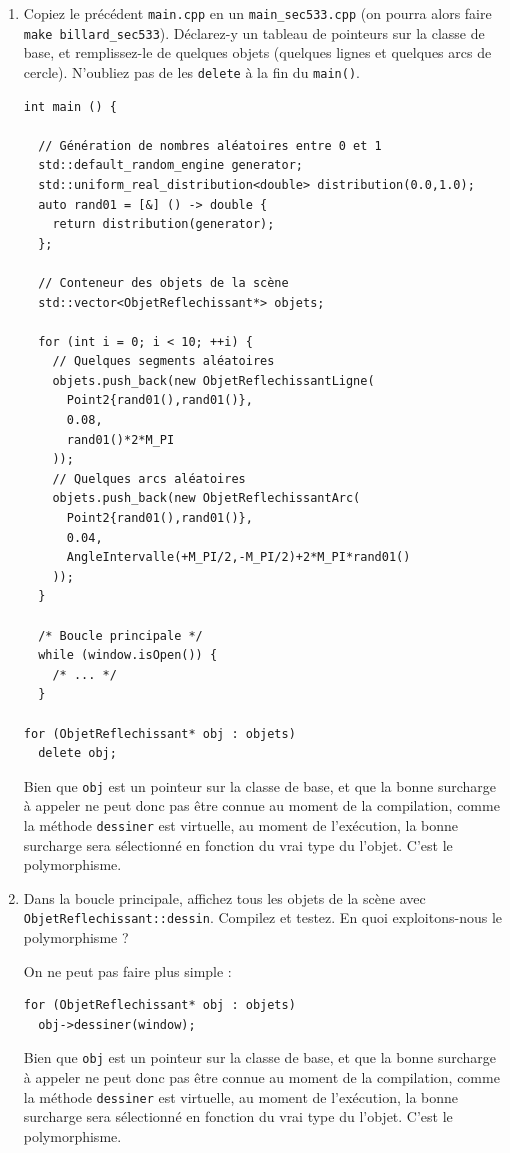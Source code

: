 \documentclass{book}
\newcommand{\inline}[1]{\texttt{#1}}
\def\filename{\texttt}
\begin{document}
\begin{enumerate}

  \item Copiez le précédent \filename{main.cpp} en un \filename{main\_sec533.cpp} (on pourra alors faire \texttt{make billard\_sec533}). Déclarez-y un tableau de pointeurs sur la classe de base, et remplissez-le de quelques objets (quelques lignes et quelques arcs de cercle). N'oubliez pas de les \inline{delete} à la fin du \inline{main()}.

\begin{correction}
\begin{verbatim}
int main () {

  // Génération de nombres aléatoires entre 0 et 1
  std::default_random_engine generator;
  std::uniform_real_distribution<double> distribution(0.0,1.0);
  auto rand01 = [&] () -> double {
    return distribution(generator);
  };

  // Conteneur des objets de la scène
  std::vector<ObjetReflechissant*> objets;

  for (int i = 0; i < 10; ++i) {
    // Quelques segments aléatoires
    objets.push_back(new ObjetReflechissantLigne(
      Point2{rand01(),rand01()},
      0.08,
      rand01()*2*M_PI
    ));
    // Quelques arcs aléatoires
    objets.push_back(new ObjetReflechissantArc(
      Point2{rand01(),rand01()},
      0.04,
      AngleIntervalle(+M_PI/2,-M_PI/2)+2*M_PI*rand01()
    ));
  }

  /* Boucle principale */
  while (window.isOpen()) {
    /* ... */
  }

for (ObjetReflechissant* obj : objets) 
  delete obj;
\end{verbatim}
Bien que \inline{obj} est un pointeur sur la classe de base, et que la bonne surcharge à appeler ne peut donc pas être connue au moment de la compilation, comme la méthode \inline{dessiner} est virtuelle, au moment de l'exécution, la bonne surcharge sera sélectionné en fonction du vrai type du l'objet. C'est le polymorphisme.
\end{correction}

  \item Dans la boucle principale, affichez tous les objets de la scène avec \inline{ObjetReflechissant::dessin}. Compilez et testez. En quoi exploitons-nous le polymorphisme ?

\begin{correction}
On ne peut pas faire plus simple :
\begin{verbatim}
for (ObjetReflechissant* obj : objets) 
  obj->dessiner(window);
\end{verbatim}
Bien que \inline{obj} est un pointeur sur la classe de base, et que la bonne surcharge à appeler ne peut donc pas être connue au moment de la compilation, comme la méthode \inline{dessiner} est virtuelle, au moment de l'exécution, la bonne surcharge sera sélectionné en fonction du vrai type du l'objet. C'est le polymorphisme.
\end{correction}


\end{enumerate}
\end{document}
